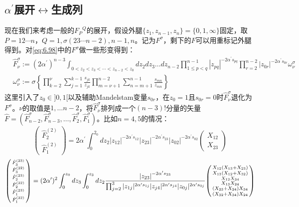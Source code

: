 \subsection{$\alpha^\prime$展开$\leftrightarrow$生成列}
现在我们来考虑一般的${F_{P}}^Q$的展开，假设外腿$\{z_1,z_{n-1},z_n\} = \{0,1,\infty\}$固定，取$P=12\cdots n$，$Q=1,\sigma(23\cdots n-2),n-1,n$。记为$F^\sigma$，剩下的$F$可以用重标记外腿得到。对\ref{eq:6.98}中的$F^\sigma$做一些形变得到：
\begin{equation}
	\begin{aligned}
		&\hat{F}_\nu^\sigma:=(2\alpha^{\prime})^{n-3}\int_{0<z_2<z_3<\cdots<z_{n-2}<z_0}dz_2dz_3\ldots dz_{n-2}\prod_{1\leq p<q}^{n-1}|z_{pq}|^{-2\alpha^{\prime}s_{pq}}\prod_{r=2}^{n-2}|z_{0r}|^{-2\alpha^{\prime}s_{0r}}\omega_\nu^\sigma\\
		&\omega_\nu^\sigma:=\sigma\left\{\prod_{k=2}^\nu\sum_{j=1}^{k-1}\frac{s_{jk}}{z_{jk}}\prod_{m=\nu+1}^{n-2}\sum_{n=m+1}^{n-1}\frac{s_{mn}}{z_{mn}}\right\}
	\end{aligned}
\end{equation}
这里引入了$z_0\in]0,1[$以及辅助Mandelstam变量$s_{0r}$，在$z_0=1$且$s_{0r}=0$时$\hat{ F }^\sigma_\nu$退化为$F^\sigma $。$\nu$的取值是$1,\ldots n-2$，将${\hat{F}}^\sigma_\nu$排列成一个$(n-3)!$分量的矢量$\hat{F}=(\hat{F}_{n-2}^\sigma,\hat{F}_{n-3}^\sigma,\ldots,\hat{F}_2^\sigma,\hat{F}_1^\sigma)$。比如$n=4,5$的情况：
\begin{equation}
	\begin{pmatrix}\hat{F}_{2}^{(2)}\\\hat{F}_{1}^{(2)}\end{pmatrix}=2\alpha^{\prime}\int_0^{2_0}dz_2|z_{12}|^{-2\alpha^{\prime}s_{12}}|z_{23}|^{-2\alpha^{\prime}s_{23}}|z_{02}|^{-2\alpha^{\prime}s_{02}}\begin{pmatrix}X_{12}\\X_{23}\end{pmatrix}
\end{equation}
\begin{equation}
\begin{aligned}
		\begin{psmallmatrix}\hat{F}_3^{(23)}\\\hat{F}_3^{(32)}\\\hat{F}_2^{(23)}\\\hat{F}_2^{(32)}\\\hat{F}_1^{(23)}\\\hat{F}_1^{(32)}\end{psmallmatrix}
		=(2\alpha^{\prime})^2\int_0^{z_0}dz_3\int_0^{z_3}dz_2
		\frac{\left|z_{23}\right|^{-2\alpha^{\prime}s_{23}}}
		{\prod_{j=2}^3|z_{1j}|^{2\alpha^{\prime}s_{1j}}|z_{j4}|^{2\alpha^{\prime}s_{j4}}|z_{0j}|^{2\alpha^{\prime}s_{0j}}}
	\begin{psmallmatrix}
		X_{12}(X_{13}+X_{23})\\X_{13}(X_{12}+X_{32})\\X_{12}X_{34}\\X_{13}X_{24}\\(X_{23}+X_{24})X_{34}\\(X_{32}+X_{34})X_{24}
	\end{psmallmatrix}
\end{aligned}
\end{equation}
